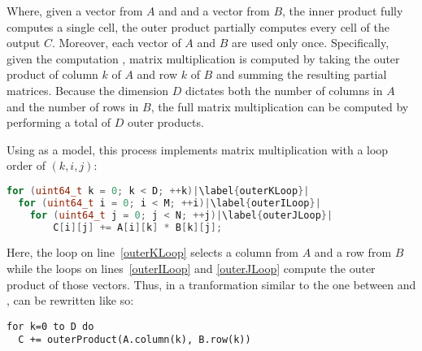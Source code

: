 \documentclass[\main/thesis.tex]{subfiles}
\begin{document}
Where, given a vector from $A$ and and a vector from $B$, the inner product fully computes a single cell, the outer product partially computes every cell of the output $C$.
Moreover, each vector of $A$ and $B$ are used only once.
Specifically, given the computation , matrix multiplication is computed by taking the outer product of column $k$ of $A$ and row $k$ of $B$ and summing the resulting partial matrices.
Because the dimension $D$ dictates both the number of columns in $A$ and the number of rows in $B$, the full matrix multiplication can be computed by performing a total of $D$ outer products.

Using  as a model, this process implements matrix multiplication with a loop order of $(k, i, j)$:
\begin{lstlisting}[caption={[Basic Matrix Multiplication via Outer Product]A basic matrix multiplication via outer product.},label=lst:basicOuter,language=C++,columns=flexible,morekeywords=uint64_t,escapechar=|]
for (uint64_t k = 0; k < D; ++k)|\label{outerKLoop}|
  for (uint64_t i = 0; i < M; ++i)|\label{outerILoop}|
    for (uint64_t j = 0; j < N; ++j)|\label{outerJLoop}|
        C[i][j] += A[i][k] * B[k][j];
\end{lstlisting}
Here, the loop on line~\ref{outerKLoop} selects a column from $A$ and a row from $B$ while the loops on lines~\ref{outerILoop} and \ref{outerJLoop} compute the outer product of those vectors.
Thus, in a tranformation similar to the one between  and ,  can be rewritten like so:
\begin{lstlisting}[caption={[Matrix Multiplication Pseudocode Using Outer Product]A basic matrix multiplication via outer product broken into logical concepts.},label=lst:basicOuterPseudo,columns=flexible]
for k=0 to D do
  C += outerProduct(A.column(k), B.row(k))
\end{lstlisting}
\end{document}
